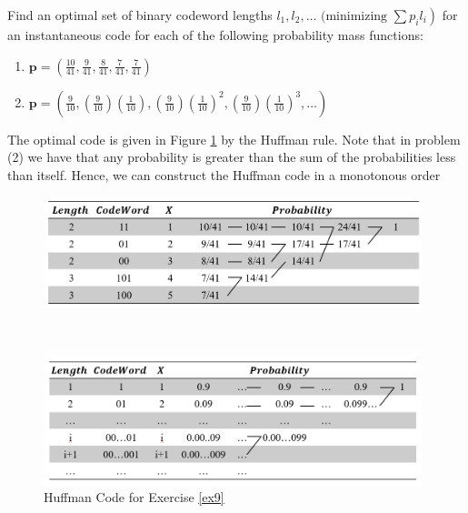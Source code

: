 \begin{exercise}{ Find an optimal set of binary codeword lengths $\left.l_{1}, l_{2}, \ldots \text { (minimizing } \sum p_{i} l_{i}\right)$ for an instantaneous code for each of the following probability mass functions:
  \begin{enumerate}
    \item $\mathbf{p}=\left(\frac{10}{41}, \frac{9}{41}, \frac{8}{41}, \frac{7}{41}, \frac{7}{41}\right)$
    \item $\mathbf{p}=\left(\frac{9}{10},\left(\frac{9}{10}\right)\left(\frac{1}{10}\right),\left(\frac{9}{10}\right)\left(\frac{1}{10}\right)^{2},\left(\frac{9}{10}\right)\left(\frac{1}{10}\right)^{3}, \ldots\right)$
  \end{enumerate}
  }
  \begin{solution} The optimal code is given in Figure \ref{fig:ex9} by the Huffman rule. Note that in problem (2) we have that any probability is greater than the sum of the probabilities less than itself. Hence, we can construct the Huffman code in a monotonous order
  \end{solution}
  \label{ex9}
\end{exercise}

\begin{figure}[htbp]
  \centering
  \caption{Huffman Code for Exercise \ref{ex9}}
      \begin{minipage}[t]{0.95\linewidth}
          \centering
          \includegraphics[width=11cm]{img/5-5.png}
      \end{minipage}
      \par{~}
      \begin{minipage}[t]{0.95\linewidth}
          \centering
          \includegraphics[width=11cm]{img/5-6.png}
      \end{minipage}
    \label{fig:ex9}
\end{figure}

